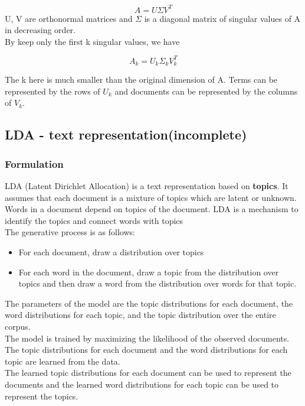 \documentclass[12pt]{article}
\begin{document}
            \[
                A = U \Sigma V^{T}
            \]
            U, V are orthonormal matrices and $\Sigma$ is a diagonal matrix of 
            singular values of A in decreasing order.
            \\
            By keep only the first k singular values, we have

            \[
                A_k = U_k \Sigma_k V_k^{T}
            \]

            The k here is much smaller than the original dimension of A.
            Terms can be represented by the rows of $U_k$ and documents can be
            represented by the columns of $V_k$.
            
    \subsection{LDA - text representation(incomplete)}
        \subsubsection{Formulation}
            LDA (Latent Dirichlet Allocation) is a text representation based
            on \textbf{topics}. It assumes that each document is a mixture of 
            topics which are latent or unknown. Words in a document depend on
            topics of the document. LDA is a mechanism to identify the topics
            and connect words with topics
            \\
            The generative process is as follows:
            \begin{itemize}
                \item For each document, draw a distribution over topics
                \item For each word in the document, draw a topic from the
                distribution over topics and then draw a word from the
                distribution over words for that topic.
            \end{itemize}
            The parameters of the model are the topic distributions for each
            document, the word distributions for each topic, and the topic
            distribution over the entire corpus.
            \\
            The model is trained by maximizing the likelihood of the observed
            documents. The topic distributions for each document and the word
            distributions for each topic are learned from the data.
            \\
            The learned topic distributions for each document can be used to
            represent the documents and the learned word distributions for each
            topic can be used to represent the topics.
            
\end{document}

